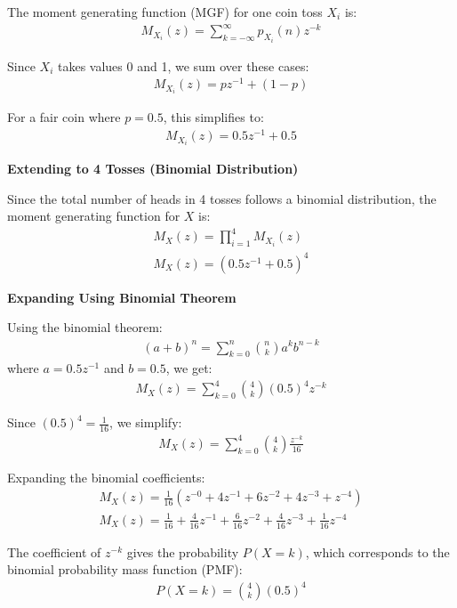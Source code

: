 \documentclass[journal]{IEEEtran}
\numberwithin{equation}{enumi}
\numberwithin{figure}{enumi}
\begin{document}
The moment generating function (MGF) for one coin toss \( X_i \) is:
\begin{align}
M_{X_i}(z) = \sum_{k=-\infty}^{\infty} p_{X_i}(n) z^{-k}
\end{align}

Since \( X_i \) takes values 0 and 1, we sum over these cases:
\begin{align}
M_{X_i}(z) = p z^{-1} + (1 - p)
\end{align}

For a fair coin where \( p = 0.5 \), this simplifies to:
\begin{align}
M_{X_i}(z) = 0.5z^{-1} + 0.5
\end{align}

\textbf{Extending to 4 Tosses (Binomial Distribution)}

Since the total number of heads in 4 tosses follows a binomial distribution, the moment generating function for \( X \) is:
\begin{align}
M_X(z) = \prod_{i=1}^{4} M_{X_i}(z) \\
M_X(z) = \left( 0.5z^{-1} + 0.5 \right)^4
\end{align}

\textbf{Expanding Using Binomial Theorem}

Using the binomial theorem:
\begin{align}
(a + b)^n = \sum_{k=0}^{n} \binom{n}{k} a^k b^{n-k}
\end{align}
where \( a = 0.5z^{-1} \) and \( b = 0.5 \), we get:
\begin{align}
M_X(z) = \sum_{k=0}^{4} \binom{4}{k} (0.5)^4 z^{-k}
\end{align}

Since \( (0.5)^4 = \frac{1}{16} \), we simplify:
\begin{align}
M_X(z) = \sum_{k=0}^{4} \binom{4}{k} \frac{z^{-k}}{16}
\end{align}

Expanding the binomial coefficients:
\begin{align}
M_X(z) = \frac{1}{16} \left( z^{-0} + 4z^{-1} + 6z^{-2} + 4z^{-3} + z^{-4} \right) \\
M_X(z) = \frac{1}{16} + \frac{4}{16}z^{-1} + \frac{6}{16}z^{-2} + \frac{4}{16}z^{-3} + \frac{1}{16}z^{-4}
\end{align}

The coefficient of \( z^{-k} \) gives the probability \( P(X = k) \), which corresponds to the binomial probability mass function (PMF):
\begin{align}
P(X = k) = \binom{4}{k} (0.5)^4
\end{align}
\end{document}
